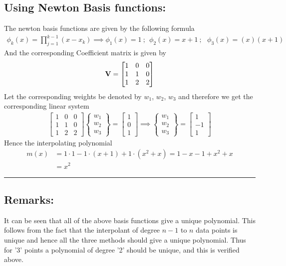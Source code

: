 \subsection*{Using Newton Basis functions: }
The newton basis functions are given by the following formula
\begin{align*}
\phi_k(x) = \prod_{j=1}^{k-1} (x-x_k) \implies \phi_1(x)  = 1\ ;\ \ \phi_2(x)  = x+1\ ;\ \ \ \phi_3(x)  = (x)(x+1)\ \ \ \  
\end{align*}
And the corresponding Coefficient matrix is given by
\begin{align*}
{\bf V} = 
\begin{bmatrix}
1 & 0 & 0 \\
1 & 1 & 0 \\
1 & 2 & 2
\end{bmatrix}
\end{align*}
Let the corresponding weights be denoted by $w_1$, $w_2$, $w_3$ and therefore we get the corresponding linear system 
\begin{align*}
\begin{bmatrix}
1 & 0 & 0 \\
1 & 1 & 0 \\
1 & 2 & 2
\end{bmatrix}
\begin{Bmatrix}
w_1 \\ w_2 \\ w_3
\end{Bmatrix} = 
\begin{bmatrix}
1 \\ 0 \\ 1
\end{bmatrix}
\implies 
\begin{Bmatrix}
w_1 \\ w_2 \\ w_3
\end{Bmatrix} =
\begin{bmatrix}
1\\-1\\1
\end{bmatrix}
\end{align*}
Hence the interpolating polynomial 
\begin{align*}
m(x) & = 1\cdot1 -1\cdot(x+1)+1\cdot(x^2+x) = 1-x-1+x^2+x 
\\ & \boxed{ = x^2}
\end{align*}\hrule
\subsection*{Remarks: }
It can be seen that all of the above basis functions give a unique polynomial. This follows from the fact that the interpolant of degree $n-1$ to $n$ data points is unique and hence all the three methods should give a unique polynomial. Thus for '3' points a polynomial of degree '2' should be unique, and this is verified above. 
